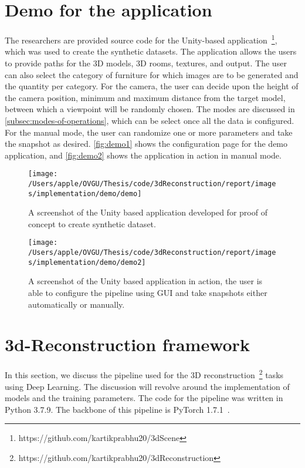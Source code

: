 \section{Demo for the application}\label{sec:demo}

The researchers are provided source code for the Unity-based application~\footnote{https://github.com/kartikprabhu20/3dScene}, which was used to create the synthetic datasets.
The application allows the users to provide paths for the 3D models, 3D rooms, textures, and output.
The user can also select the category of furniture for which images are to be generated and the quantity per category.
For the camera, the user can decide upon the height of the camera position, minimum and maximum distance from the target model, between which a viewpoint will be randomly chosen.
The modes are discussed in \autoref{subsec:modes-of-operations}, which can be select once all the data is configured.
For the manual mode, the user can randomize one or more parameters and take the snapshot as desired.
\autoref{fig:demo1} shows the configuration page for the demo application, and \autoref{fig:demo2} shows the application in action in manual mode.

\begin{figure}
    \centering
    \texttt{[image: /Users/apple/OVGU/Thesis/code/3dReconstruction/report/images/implementation/demo/demo]}
    \caption{A screenshot of the Unity based application developed for proof of concept to create synthetic dataset.}
    \label{fig:demo1}
\end{figure}

\begin{figure}
    \centering
    \texttt{[image: /Users/apple/OVGU/Thesis/code/3dReconstruction/report/images/implementation/demo/demo2]}
    \caption{A screenshot of the Unity based application in action, the user is able to configure the pipeline using GUI and take snapshots either automatically or manually.}
    \label{fig:demo2}
\end{figure}

\section{3d-Reconstruction framework}\label{sec:3d-reconstruction-framework}

In this section, we discuss the pipeline used for the 3D reconstruction~\footnote{https://github.com/kartikprabhu20/3dReconstruction} tasks using Deep Learning.
The discussion will revolve around the implementation of models and the training parameters.
The code for the pipeline was written in Python 3.7.9.
The backbone of this pipeline is PyTorch 1.7.1~\cite{NEURIPS2019_9015}.

